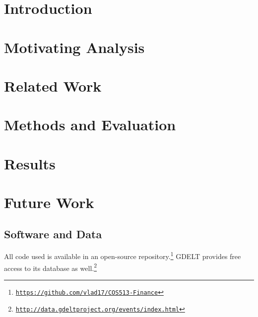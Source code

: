 \documentclass{article}
\begin{document}
\section{Introduction}
 


 
\section{Motivating Analysis}



\section{Related Work}



\section{Methods and Evaluation}



\section{Results}






\section{Future Work}



\subsection{Software and Data}

All code used is available in an open-source repository.\footnote{\hyperref[https://github.com/vlad17/COS513-Finance]{\texttt{https://github.com/vlad17/COS513-Finance}}} GDELT provides free access to its database as well.\footnote{ \hyperref[http://data.gdeltproject.org/events/index.html]{\texttt{http://data.gdeltproject.org/events/index.html}}}
\end{document}
